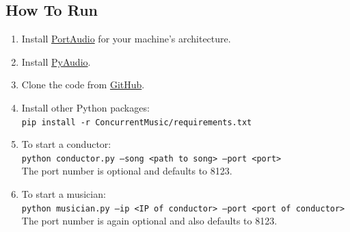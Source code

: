 \documentclass[12pt, letterpaper]{article}
\begin{document}
\subsection{How To Run}
\begin{enumerate}
\item Install \href{http://www.portaudio.com/}{PortAudio} for your machine's architecture.
\item Install \href{http://people.csail.mit.edu/hubert/pyaudio/}{PyAudio}.
\item Clone the code from \href{https://github.com/TylerLubeck/ConcurrentMusic}{GitHub}.
\item Install other Python packages:\\
\texttt{pip install -r ConcurrentMusic/requirements.txt}
\item To start a conductor:\\
\texttt{python conductor.py --song <path to song> --port <port>}\\
The port number is optional and defaults to 8123.
\item To start a musician:\\
\texttt{python musician.py --ip <IP of conductor> --port <port of conductor>}\\
The port number is again optional and also defaults to 8123.
\end{enumerate}
\end{document}

